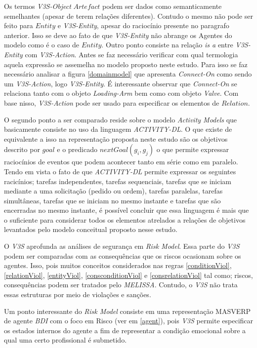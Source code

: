 Os termos \textit{V3S-Object} $Artefact$ podem ser dados como semanticamente semelhantes (apesar de terem relações diferentes). Contudo o mesmo não pode ser feito para $Entity$ e \textit{V3S-Entity}, apesar do raciocínio presente no paragrafo anterior. Isso se deve ao fato de que \textit{V3S-Entity} não abrange os Agentes do modelo como é o caso de $Entity$. Outro ponto consiste na relação \textit{is a} entre \textit{V3S-Entity} com \textit{V3S-Action}. Antes se faz necessário verificar com qual termologia aquela expressão se assemelha no modelo proposto neste estudo. Para isso se faz necessário analisar a figura \ref{domainmodel} que apresenta \textit{Connect-On} como sendo um \textit{V3S-Action}, logo \textit{V3S-Entity}. É interessante observar que \textit{Connect-On} se relaciona tanto com o objeto \textit{Loading-Arm} bem como com objeto \textit{Valve}. Com base nisso, \textit{V3S-Action} pode ser usado para especificar os elementos de $Relation$. 

O segundo ponto a ser comparado reside sobre o modelo \textit{Activity Models} que basicamente consiste no uso da linguagem \textit{ACTIVITY-DL}. O que existe de equivalente a isso na representação proposta neste estudo são os objetivos descrito por $goal$ e o predicado $nextGoal(g_i,g_j)$ o que permite expressar raciocínios de eventos que podem acontecer tanto em série como em paralelo. Tendo em vista o fato de que \textit{ACTIVITY-DL} permite expressar os seguintes racicínios; tarefas independentes, tarefas sequenciais, tarefas que se iniciam mediante a uma solicitação (pedido ou ordem), tarefas paralelas, tarefas  simultâneas, tarefas que se iniciam no mesmo instante e tarefas que são encerradas no mesmo instante, é possível concluir que essa linguagem é mais que o suficiente para considerar todos os elementos atrelados a relações de objetivos levantados pelo modelo conceitual proposto nesse estudo.  

O \textit{V3S} aprofunda as análises de segurança em \textit{Risk Model}. Essa parte do \textit{V3S} podem ser comparadas com as consequências que os riscos ocasionam sobre os agentes. Isso, pois muitos conceitos considerados nas regras \ref{conditionViol}, \ref{relationViol}, \ref{entityViol}, \ref{consconditionViol} e \ref{consrelationViol} tal como; riscos, consequências podem ser tratados pelo \textit{MELISSA}. Contudo, o \textit{V3S} não trata essas estruturas por meio de violações e sanções. 

Um ponto interessante do \textit{Risk Model} consiste em uma representação MASVERP  de agente \textit{BDI} com o foco em Risco (ver em \ref{agent}), pois \textit{V3S} permite especificar os estados internos do agente a fim de representar a condição emocional sobre a qual uma certo profissional é submetido. 
